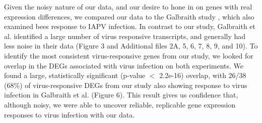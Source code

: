 \documentclass{bmcart}
\begin{document}
\begin{linenumbers}
\begin{doublespacing}
Given the noisy nature of our data, and our desire to hone in on genes with real expression differences, we compared our data to the Galbraith study \cite{galbraith}, which also examined bees response to IAPV infection. In contrast to our study, Galbraith et al. identified a large number of virus responsive transcripts, and generally had less noise in their data (Figure 3 and Additional files 2A, 5, 6, 7, 8, 9, and 10). To identify the most consistent virus-responsive genes from our study, we looked for overlap in the DEGs associated with virus infection on both experiments. We found a large, statistically significant (p-value $<$ 2.2e-16) overlap, with 26/38 (68\%) of virus-responsive DEGs from our study also showing response to virus infection in Galbraith et al. (Figure 6). This result gives us confidence that, although noisy, we were able to uncover reliable, replicable gene expression responses to virus infection with our data.


\end{doublespacing}
\end{linenumbers}
\end{document}
